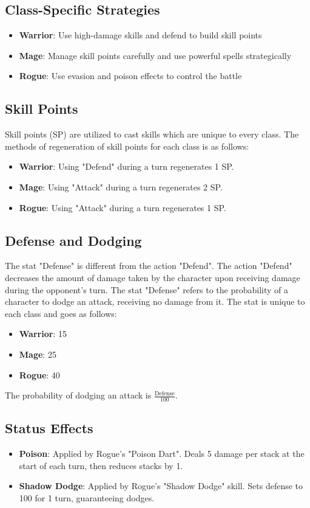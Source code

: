 \documentclass[12pt]{article}
\begin{document}
\subsection{Class-Specific Strategies}
\begin{itemize}
    \item \textbf{Warrior}: Use high-damage skills and defend to build skill points
    \item \textbf{Mage}: Manage skill points carefully and use powerful spells strategically
    \item \textbf{Rogue}: Use evasion and poison effects to control the battle
\end{itemize}

\subsection{Skill Points}
Skill points (SP) are utilized to cast skills which are unique to every class. The methods of regeneration of skill points for each class is as follows:
\begin{itemize}
    \item \textbf{Warrior}: Using "Defend" during a turn regenerates 1 SP.
    \item \textbf{Mage}: Using "Attack" during a turn regenerates 2 SP.
    \item \textbf{Rogue}: Using "Attack" during a turn regenerates 1 SP.
\end{itemize}

\subsection{Defense and Dodging}
The stat "Defense" is different from the action "Defend". The action "Defend" decreases the amount of damage taken by the character upon receiving damage during the opponent's turn. The stat "Defense" refers to the probability of a character to dodge an attack, receiving no damage from it. The stat is unique to each class and goes as follows:
\begin{itemize}
    \item \textbf{Warrior}: 15
    \item \textbf{Mage}: 25
    \item \textbf{Rogue}: 40
\end{itemize}
The probability of dodging an attack is $\frac{\text{Defense}}{100}$.

\subsection{Status Effects}
\begin{itemize}
    \item \textbf{Poison}: Applied by Rogue's "Poison Dart". Deals 5 damage per stack at the start of each turn, then reduces stacks by 1.
    \item \textbf{Shadow Dodge}: Applied by Rogue's "Shadow Dodge" skill. Sets defense to 100 for 1 turn, guaranteeing dodges.
\end{itemize}
\end{document}
